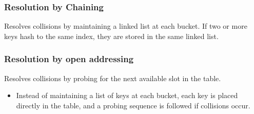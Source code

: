 \documentclass{article}
\begin{document}
\subsubsection{Resolution by Chaining}
\begin{definition}
Resolves collisions by maintaining a linked list at each bucket. If two or more keys hash to the same index, they are stored in the same linked list.
\end{definition}

\subsubsection{Resolution by open addressing}
\begin{definition}
    Resolves collisions by probing for the next available slot in the table. 
    \begin{itemize}
        \item Instead of maintaining a list of keys at each bucket, each key is placed directly in the table, and a probing sequence is followed if collisions occur.
    \end{itemize}
    \end{definition}
    
\end{document}
